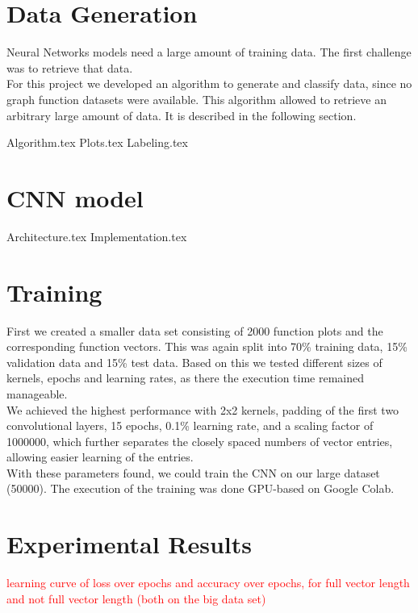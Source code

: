 \documentclass[11pt,a4paper]{scrartcl}
\begin{document}
	\section{Data Generation}
	Neural Networks models need a large amount of training data. The first challenge was to retrieve that data.\\
	For this project we developed an algorithm to generate and classify data, since no graph function datasets were available. This algorithm allowed to retrieve an arbitrary large amount of data. It is described in the following section.
	
	{Algorithm.tex}
	{Plots.tex}
	{Labeling.tex}


	\section{CNN model}
	{Architecture.tex}
	{Implementation.tex}
	
	\section{Training}
	First we created a smaller data set consisting of 2000 function plots and the corresponding function vectors. This was again split into 70\% training data, 15\% validation data and 15\% test data. Based on this we tested different sizes of kernels, epochs and learning rates, as there the execution time remained manageable.\\
	We achieved the highest performance with 2x2 kernels, padding of the first two convolutional layers, 15 epochs, 0.1\% learning rate, and a scaling factor of 1000000, which further separates the closely spaced numbers of vector entries, allowing easier learning of the entries.\\
	With these parameters found, we could train the CNN on our large dataset (50000). The execution of the training was done GPU-based on Google Colab.

	\section{Experimental Results}
	\textcolor{red}{learning curve of loss over epochs and accuracy over epochs, for full vector length and not full vector length (both on the big data set)}
\end{document}
